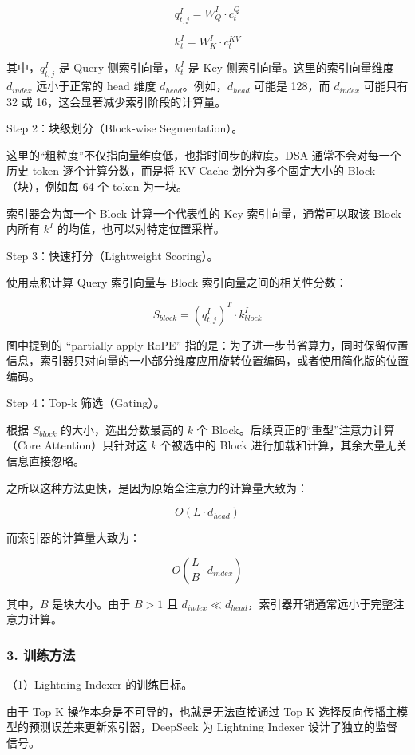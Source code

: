 \[
q^I_{t,j} = W^I_Q \cdot c^Q_t
\]

\[
k^I_t = W^I_K \cdot c^{KV}_t
\]

其中，\(q^I_{t,j}\) 是 Query 侧索引向量，\(k^I_t\) 是 Key 侧索引向量。这里的索引向量维度 \(d_{index}\) 远小于正常的 head 维度 \(d_{head}\)。例如，\(d_{head}\) 可能是 128，而 \(d_{index}\) 可能只有 32 或 16，这会显著减少索引阶段的计算量。

Step 2：块级划分（Block-wise Segmentation）。

这里的``粗粒度''不仅指向量维度低，也指时间步的粒度。DSA 通常不会对每一个历史 token 逐个计算分数，而是将 KV Cache 划分为多个固定大小的 Block（块），例如每 64 个 token 为一块。

索引器会为每一个 Block 计算一个代表性的 Key 索引向量，通常可以取该 Block 内所有 \(k^I\) 的均值，也可以对特定位置采样。

Step 3：快速打分（Lightweight Scoring）。

使用点积计算 Query 索引向量与 Block 索引向量之间的相关性分数：

\[
S_{block} = (q^I_{t,j})^T \cdot k^I_{block}
\]

图中提到的 ``partially apply RoPE'' 指的是：为了进一步节省算力，同时保留位置信息，索引器只对向量的一小部分维度应用旋转位置编码，或者使用简化版的位置编码。

Step 4：Top-k 筛选（Gating）。

根据 \(S_{block}\) 的大小，选出分数最高的 \(k\) 个 Block。后续真正的``重型''注意力计算（Core Attention）只针对这 \(k\) 个被选中的 Block 进行加载和计算，其余大量无关信息直接忽略。

之所以这种方法更快，是因为原始全注意力的计算量大致为：

\[
O(L \cdot d_{head})
\]

而索引器的计算量大致为：

\[
O\left(\frac{L}{B} \cdot d_{index}\right)
\]

其中，\(B\) 是块大小。由于 \(B > 1\) 且 \(d_{index} \ll d_{head}\)，索引器开销通常远小于完整注意力计算。

\hypertarget{ux8badux7ec3ux65b9ux6cd5}{%
\subsubsection{3. 训练方法}\label{ux8badux7ec3ux65b9ux6cd5}}

（1）Lightning Indexer 的训练目标。

由于 Top-K 操作本身是不可导的，也就是无法直接通过 Top-K 选择反向传播主模型的预测误差来更新索引器，DeepSeek 为 Lightning Indexer 设计了独立的监督信号。

